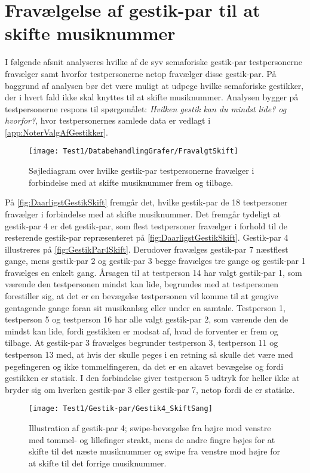 \section{Fravælgelse af gestik-par til at skifte musiknummer}
\label{app:TestresultaterSkiftDaarlig}
%
I følgende afsnit analyseres hvilke af de syv semaforiske gestik-par testpersonerne fravælger samt hvorfor testpersonerne netop fravælger disse gestik-par. På baggrund af analysen bør det være muligt at udpege hvilke semaforiske gestikker, der i hvert fald ikke skal knyttes til at skifte musiknummer. Analysen bygger på testpersonerne respons til spørgsmålet: \textit{Hvilken gestik kan du mindst lide? og hvorfor?}, hvor testpersonernes samlede data er vedlagt i \autoref{app:NoterValgAfGestikker}.
%
\begin{figure}[H]
	\centering
	\texttt{[image: Test1/DatabehandlingGrafer/FravalgtSkift]}
	\caption{Søjlediagram over hvilke gestik-par testpersonerne fravælger i forbindelse med at skifte musiknummer frem og tilbage.}
	\label{fig:DaarligstGestikSkift}
\end{figure}
\noindent
%
På \autoref{fig:DaarligstGestikSkift} fremgår det, hvilke gestik-par de 18 testpersoner fravælger i forbindelse med at skifte musiknummer. Det fremgår tydeligt at gestik-par 4 er det gestik-par, som flest testpersoner fravælger i forhold til de resterende gestik-par repræsenteret på \autoref{fig:DaarligstGestikSkift}. Gestik-par 4 illustreres på \autoref{fig:GestikPar4Skift}. Derudover fravælges gestik-par 7 næstflest gange, mens gestik-par 2 og gestik-par 3 begge fravælges tre gange og gestik-par 1 fravælges en enkelt gang. Årsagen til at testperson 14 har valgt gestik-par 1, som værende den testpersonen mindst kan lide, begrundes med at testpersonen forestiller sig, at det er en bevægelse testpersonen vil komme til at gengive gentagende gange foran sit musikanlæg eller under en samtale. Testperson 1, testperson 5 og testperson 16 har alle valgt gestik-par 2, som værende den de mindst kan lide, fordi gestikken er modsat af, hvad de forventer er frem og tilbage. At gestik-par 3 fravælges begrunder testperson 3, testperson 11 og testperson 13 med, at hvis der skulle peges i en retning så skulle det være med pegefingeren og ikke tommelfingeren, da det er en akavet bevægelse og fordi gestikken er statisk. I den forbindelse giver testperson 5 udtryk for heller ikke at bryder sig om hverken gestik-par 3 eller gestik-par 7, netop fordi de er statiske.
%
\begin{figure}[H]
	\centering
	\texttt{[image: Test1/Gestik-par/Gestik4\_SkiftSang]}
	\caption{Illustration af gestik-par 4; swipe-bevægelse fra højre mod venstre med tommel- og lillefinger strakt, mens de andre fingre bøjes for at skifte til det næste musiknummer og swipe fra venstre mod højre for at skifte til det forrige musiknummer.}
	\label{fig:GestikPar4Skift}
\end{figure}
